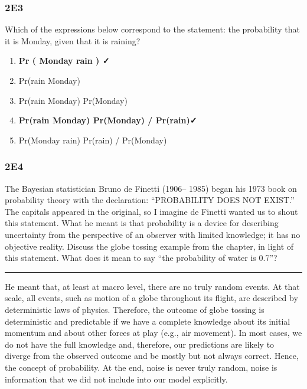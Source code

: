 \documentclass[
]{book}
\providecommand{\tightlist}{%
  \setlength{\itemsep}{0pt}\setlength{\parskip}{0pt}}
\begin{document}
\hypertarget{e3}{%
\subsubsection*{2E3}\label{e3}}

Which of the expressions below correspond to the statement: the probability that it is Monday, given that it is raining?

\begin{enumerate}
\def\labelenumi{\arabic{enumi}.}
\tightlist
\item
  \textbf{Pr ( Monday \textbar{} rain ) ✓}
\item
  Pr(rain \textbar{} Monday)
\item
  Pr(rain \textbar{} Monday) Pr(Monday)
\item
  \textbf{Pr(rain \textbar{} Monday) Pr(Monday) / Pr(rain)✓}
\item
  Pr(Monday \textbar{} rain) Pr(rain) / Pr(Monday)
\end{enumerate}

\hypertarget{e4}{%
\subsubsection*{2E4}\label{e4}}

The Bayesian statistician Bruno de Finetti (1906-- 1985) began his 1973 book on probability theory with the declaration: ``PROBABILITY DOES NOT EXIST.'' The capitals appeared in the original, so I imagine de Finetti wanted us to shout this statement. What he meant is that probability is a device for describing uncertainty from the perspective of an observer with limited knowledge; it has no objective reality. Discuss the globe tossing example from the chapter, in light of this statement. What does it mean to say ``the probability of water is 0.7''?

\begin{center}\rule{0.5\linewidth}{0.5pt}\end{center}

He meant that, at least at macro level, there are no truly random events. At that scale, all events, such as motion of a globe throughout its flight, are described by deterministic laws of physics. Therefore, the outcome of globe tossing is deterministic and predictable if we have a complete knowledge about its initial momentum and about other forces at play (e.g., air movement). In most cases, we do not have the full knowledge and, therefore, our predictions are likely to diverge from the observed outcome and be mostly but not always correct. Hence, the concept of probability. At the end, noise is never truly random, noise is information that we did not include into our model explicitly.
\end{document}
